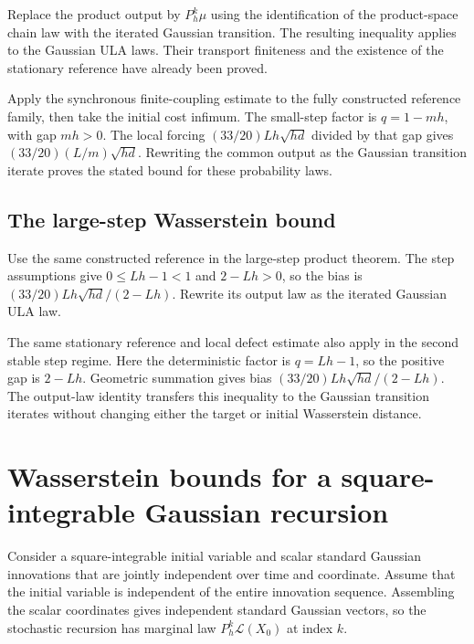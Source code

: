 \documentclass[11pt,a4paper]{article}
\begin{document}
Replace the product output by \(P_h^k\mu\) using the identification of the product-space chain law with the iterated Gaussian transition. The resulting inequality applies to the Gaussian ULA laws. Their transport finiteness and the existence of the stationary reference have already been proved.



Apply the synchronous finite-coupling estimate to the fully constructed reference family, then take the initial cost infimum. The small-step factor is \(q=1-mh\), with gap \(mh>0\). The local forcing \((33/20)Lh\sqrt{hd}\) divided by that gap gives \((33/20)(L/m)\sqrt{hd}\). Rewriting the common output as the Gaussian transition iterate proves the stated bound for these probability laws.


\subsection{\texorpdfstring{The large-step Wasserstein bound}{The large-step Wasserstein bound}}


Use the same constructed reference in the large-step product theorem. The step assumptions give \(0\le Lh-1<1\) and \(2-Lh>0\), so the bias is \((33/20)Lh\sqrt{hd}/(2-Lh)\). Rewrite its output law as the iterated Gaussian ULA law.



The same stationary reference and local defect estimate also apply in the second stable step regime. Here the deterministic factor is \(q=Lh-1\), so the positive gap is \(2-Lh\). Geometric summation gives bias \((33/20)Lh\sqrt{hd}/(2-Lh)\). The output-law identity transfers this inequality to the Gaussian transition iterates without changing either the target or initial Wasserstein distance.


\section{\texorpdfstring{Wasserstein bounds for a square-integrable Gaussian recursion}{Wasserstein bounds for a square-integrable Gaussian recursion}}


Consider a square-integrable initial variable and scalar standard Gaussian innovations that are jointly independent over time and coordinate. Assume that the initial variable is independent of the entire innovation sequence. Assembling the scalar coordinates gives independent standard Gaussian vectors, so the stochastic recursion has marginal law \(P_h^k\mathcal L(X_0)\) at index \(k\).
\end{document}
